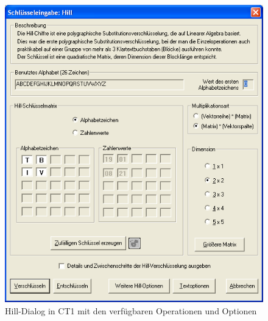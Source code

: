 \begin{refsegment}
\begin{figure}[ht]
\begin{center}
\includegraphics[scale=0.7]{figures/PaP_Fig_Hill-Cipher-CT-Dialog.png}
\caption{Hill-Dialog in CT1 mit den verfügbaren Operationen und Optionen\vspace{1ex}}
\label{PaP_Fig_Hill-Cipher-CT-Dialog}
\end{center}
\end{figure}


\end{refsegment}
